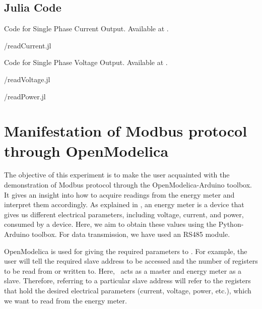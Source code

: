 \subsection{Julia Code}
\label{sec:modbus-julia-code}

\begin{juliacode}
  {Code for Single Phase Current Output.
    Available at .}
  \label{julia:current-modbus}
  
  {\LocMODjuliacode/readCurrent.jl}
\end{juliacode}

\begin{juliacode}
  {Code for Single Phase Voltage Output.
    Available at .}
  \label{julia:voltage-modbus}
  
  {\LocMODjuliacode/readVoltage.jl}
\end{juliacode}

\begin{juliacode}
  \label{julia:modbus-power}
  
  {\LocMODjuliacode/readPower.jl}
\end{juliacode}


\section{Manifestation of Modbus protocol through OpenModelica}
The objective of this experiment is to make the user acquainted with
the demonstration of Modbus protocol through the OpenModelica-Arduino toolbox. 
It gives an insight into how to acquire readings from the energy meter and interpret them accordingly. As explained in , 
an energy meter is a device that gives us different electrical parameters, including voltage, current, and power, consumed by a device. Here, we aim to obtain these values using the Python-Arduino toolbox. For data transmission, we have used an RS485 module.

OpenModelica is used for giving the required parameters to \arduino. For
example, the user will tell the required slave address to be accessed
and the number of registers to be read from or written to. Here,
\arduino\ acts as a master and energy meter as a slave. Therefore,
referring to a particular slave address will refer to the registers
that hold the desired electrical parameters (current, voltage, power, etc.), which we want to read from the energy meter.

